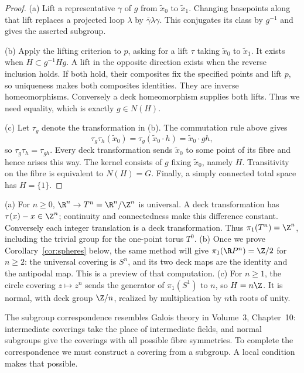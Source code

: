 \begin{proof}
(a) Lift a representative $\gamma$ of $g$ from $\tilde x_0$ to $\tilde x_1$. Changing basepoints along that lift replaces a projected loop $\lambda$ by $\bar\gamma\lambda\gamma$. This conjugates its class by $g^{-1}$ and gives the asserted subgroup.

(b) Apply the lifting criterion to $p$, asking for a lift $\tau$ taking $\tilde x_0$ to $\tilde x_1$. It exists when $H\subset g^{-1}Hg$. A lift in the opposite direction exists when the reverse inclusion holds. If both hold, their composites fix the specified points and lift $p$, so uniqueness makes both composites identities. They are inverse homeomorphisms. Conversely a deck homeomorphism supplies both lifts. Thus we need equality, which is exactly $g\in N(H)$.

(c) Let $\tau_g$ denote the transformation in (b). The commutation rule above gives
\[
\tau_g\tau_h(\tilde x_0)=\tau_g(\tilde x_0\cdot h)=\tilde x_0\cdot gh,
\]
so $\tau_g\tau_h=\tau_{gh}$. Every deck transformation sends $\tilde x_0$ to some point of its fibre and hence arises this way. The kernel consists of $g$ fixing $\tilde x_0$, namely $H$. Transitivity on the fibre is equivalent to $N(H)=G$. Finally, a simply connected total space has $H=\{1\}$.
\end{proof}

\begin{example}\label{ex:computations}
(a) For $n\ge0$, $\R^n\to T^n=\R^n/\Z^n$ is universal. A deck transformation has $\tau(x)-x\in\Z^n$; continuity and connectedness make this difference constant. Conversely each integer translation is a deck transformation. Thus $\pi_1(T^n)=\Z^n$, including the trivial group for the one-point torus $T^0$.
(b) Once we prove Corollary~\ref{cor:spheres} below, the same method will give $\pi_1(\R P^n)=\Z/2$ for $n\ge2$: the universal covering is $S^n$, and its two deck maps are the identity and the antipodal map. This is a preview of that computation.
(c) For $n\ge1$, the circle covering $z\mapsto z^n$ sends the generator of $\pi_1(S^1)$ to $n$, so $H=n\Z$. It is normal, with deck group $\Z/n$, realized by multiplication by $n$th roots of unity.
\end{example}

The subgroup correspondence resembles Galois theory in Volume~3, Chapter~10: intermediate coverings take the place of intermediate fields, and normal subgroups give the coverings with all possible fibre symmetries. To complete the correspondence we must construct a covering from a subgroup. A local condition makes that possible.

